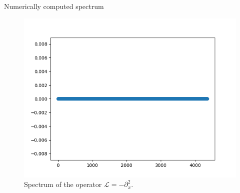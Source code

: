 \documentclass{beamer}
\begin{document}
\begin{frame}{Numerically computed spectrum}
\begin{figure}
\begin{center}
\includegraphics[scale=0.4]{dxxSpectrum.png}
\end{center}
\caption{Spectrum of the operator $\mathcal{L} = -\partial_{x}^2$.}
\end{figure}

\end{frame}

%

\end{document}
